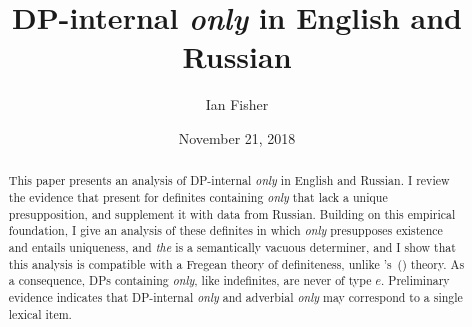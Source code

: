 \documentclass{article}
\title{DP-internal \textit{only} in English and Russian}
\author{Ian Fisher}
\date{November 21, 2018}
\newcommand{\citegen}[1]{\citeauthor{#1}'s~(\citeyear{#1})}
\begin{document}
\maketitle

\begin{abstract}
This paper presents an analysis of DP-internal \textit{only} in English and Russian. I review the evidence that \citet{cb2012b, cb2015} present for definites containing \textit{only} that lack a unique presupposition, and supplement it with data from Russian. Building on this empirical foundation, I give an analysis of these definites in which \textit{only} presupposes existence and entails uniqueness, and \textit{the} is a semantically vacuous determiner, and I show that this analysis is compatible with a Fregean theory of definiteness, unlike \citegen{cb2015} theory. As a consequence, DPs containing \textit{only}, like indefinites, are never of type $e$. Preliminary evidence indicates that DP-internal \textit{only} and adverbial \textit{only} may correspond to a single lexical item.
\end{abstract}












\end{document}
